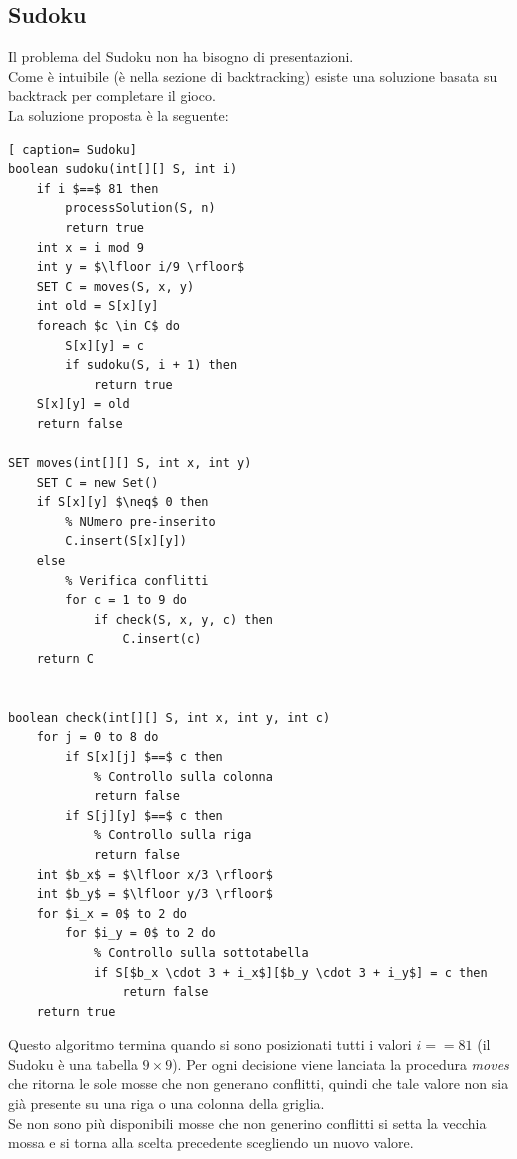\documentclass[../cheatSheetAlgoritmi.tex]{subfiles}
\begin{document}
\subsection{Sudoku}
Il problema del Sudoku non ha bisogno di presentazioni. \\
Come è intuibile (è nella sezione di backtracking) esiste una soluzione basata su backtrack per completare il gioco. \\
La soluzione proposta è la seguente: 
 \begin{lstlisting}[ caption= Sudoku]
boolean sudoku(int[][] S, int i)
	if i $==$ 81 then
		processSolution(S, n)
		return true
	int x = i mod 9
	int y = $\lfloor i/9 \rfloor$
	SET C = moves(S, x, y)
	int old = S[x][y]
	foreach $c \in C$ do
		S[x][y] = c
		if sudoku(S, i + 1) then
			return true
	S[x][y] = old
	return false
	
SET moves(int[][] S, int x, int y)
	SET C = new Set()
	if S[x][y] $\neq$ 0 then
		% NUmero pre-inserito
		C.insert(S[x][y])
	else
		% Verifica conflitti
		for c = 1 to 9 do
			if check(S, x, y, c) then
				C.insert(c)
	return C
	
	
boolean check(int[][] S, int x, int y, int c)
	for j = 0 to 8 do
		if S[x][j] $==$ c then
			% Controllo sulla colonna
			return false
		if S[j][y] $==$ c then
			% Controllo sulla riga
			return false
	int $b_x$ = $\lfloor x/3 \rfloor$
	int $b_y$ = $\lfloor y/3 \rfloor$
	for $i_x = 0$ to 2 do
		for $i_y = 0$ to 2 do
			% Controllo sulla sottotabella
			if S[$b_x \cdot 3 + i_x$][$b_y \cdot 3 + i_y$] = c then
				return false
	return true 
\end{lstlisting}
Questo algoritmo termina quando si sono posizionati tutti i valori $i == 81$ (il Sudoku è una tabella $9 \times 9$). 
Per ogni decisione viene lanciata la procedura \emph{moves} che ritorna le sole mosse che non generano conflitti, quindi che tale valore non sia già presente su una riga o una colonna della griglia. \\ Se non sono più disponibili mosse che non generino conflitti si setta la vecchia mossa e si torna alla scelta precedente scegliendo un nuovo valore.
\end{document}
